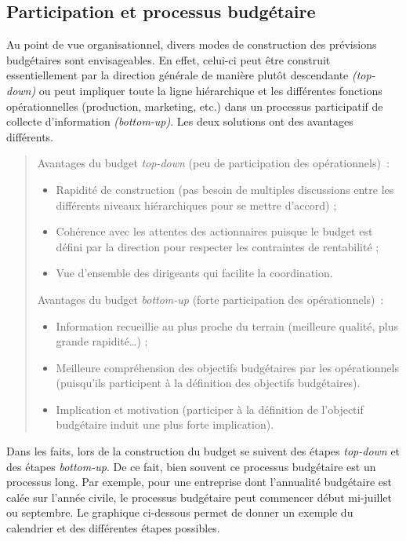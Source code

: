 \documentclass{tufte-handout}
\begin{document}
\subsection{Participation et processus budgétaire}
\label{sec:org06edb3f}
Au point de vue organisationnel, divers modes de construction des prévisions budgétaires sont envisageables. En effet, celui-ci peut être construit essentiellement par la direction générale de manière plutôt descendante \emph{(top-down)} ou peut impliquer toute la ligne hiérarchique et les différentes fonctions opérationnelles (production, marketing, etc.) dans un processus participatif de collecte d'information \emph{(bottom-up)}. Les deux solutions ont des avantages différents.\\
\begin{quote}
Avantages du budget \emph{top-down} (peu de participation des opérationnels) :\\
\begin{itemize}
\item Rapidité de construction (pas besoin de multiples discussions entre les différents niveaux hiérarchiques pour se mettre d'accord) ;\\
\item Cohérence avec les attentes des actionnaires puisque le budget est défini par la direction pour respecter les contraintes de rentabilité ;\\
\item Vue d'ensemble des dirigeants qui facilite la coordination.\\
\end{itemize}
Avantages du budget \emph{bottom-up} (forte participation des opérationnels) :\\
\begin{itemize}
\item Information recueillie au plus proche du terrain (meilleure qualité, plus grande rapidité\ldots{}) ;\\
\item Meilleure compréhension des objectifs budgétaires par les opérationnels (puisqu'ils participent à la définition des objectifs budgétaires).\\
\item Implication et motivation (participer à la définition de l'objectif budgétaire induit une plus forte implication).\\
\end{itemize}
\end{quote}
Dans les faits, lors de la construction du budget se suivent des étapes \emph{top-down} et des étapes \emph{bottom-up}. De ce fait, bien souvent ce processus budgétaire est un processus long. Par exemple, pour une entreprise dont l'annualité budgétaire est calée sur l'année civile, le processus budgétaire peut commencer début mi-juillet ou septembre. Le graphique ci-dessous permet de donner un exemple du calendrier et des différentes étapes possibles.\\
\end{document}
